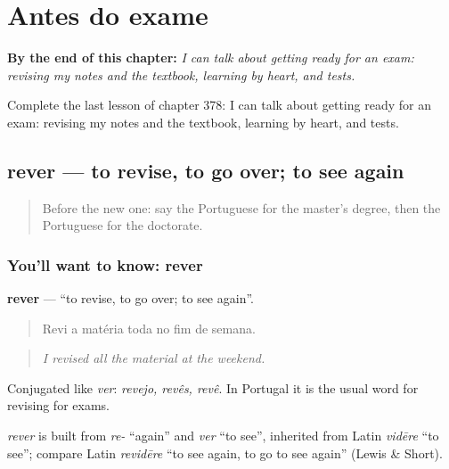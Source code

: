 
\chapter{Antes do exame}
\label{ch:pt-antes-do-exame}

\begin{chapteropening}
\textbf{By the end of this chapter:} \emph{I can talk about getting ready for an exam: revising my notes and the textbook, learning by heart, and tests.}

Complete the last lesson of chapter 378: I can talk about getting ready for an exam: revising my notes and the textbook, learning by heart, and tests.
\end{chapteropening}

\section[rever]{rever — to revise, to go over; to see again}

\label{lesson:PT-C378-rever}



\begin{quote}
Before the new one: say the Portuguese for the master's degree, then the Portuguese for the doctorate.
\end{quote}

\subsection*{You'll want to know: rever}
\textbf{rever} — \textquotedblleft{}to revise, to go over; to see again\textquotedblright{}.

\begin{quote}
Revi a matéria toda no fim de semana.
\end{quote}

\begin{quote}
\emph{I revised all the material at the weekend.}
\end{quote}

Conjugated like \emph{ver}: \emph{revejo, revês, revê}. In Portugal it is the usual word for revising for exams.

\begin{cousinweb}
\emph{rever} is built from \emph{re-} \textquotedblleft{}again\textquotedblright{} and \emph{ver} \textquotedblleft{}to see\textquotedblright{}, inherited from Latin \emph{vidēre} \textquotedblleft{}to see\textquotedblright{}; compare Latin \emph{revidēre} \textquotedblleft{}to see again, to go to see again\textquotedblright{} (Lewis \& Short).
\end{cousinweb}

